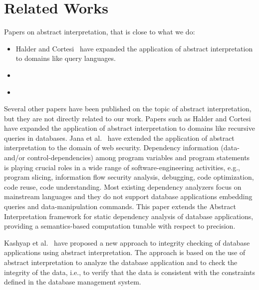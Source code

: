 \section{Related Works}\label{sec:related-works}

Papers on abstract interpretation, that is close to what we do:
\begin{itemize}
    \item Halder and Cortesi~\cite{halder_abstract_2012} have expanded the application of abstract interpretation to domains like query languages.
    \item \cite{jana_extending_2020}
    \item \cite{kashyap_integrity_2022}
\end{itemize}

Several other papers have been published on the topic of abstract interpretation, but they are not directly related to our work.
Papers such as Halder and Cortesi~\cite{halder_abstract_2012} have expanded the application of abstract interpretation to domains like recursive queries in databases.
Jana et al.~\cite{jana_extending_2020} have extended the application of abstract interpretation to the domain of web security.
Dependency information (data- and/or control-dependencies) among program variables and program statements is playing crucial roles in a wide range of software-engineering activities, e.g., program slicing, information flow security analysis, debugging, code optimization, code reuse, code understanding.
Most existing dependency analyzers focus on mainstream languages and they do not support database applications embedding queries and data-manipulation commands.
This paper extends the Abstract Interpretation framework for static dependency analysis of database applications, providing a semantics-based computation tunable with respect to precision.

Kashyap et al.~\cite{kashyap_integrity_2022} have proposed a new approach to integrity checking of database applications using abstract interpretation.
The approach is based on the use of abstract interpretation to analyze the database application and to check the integrity of the data, i.e., to verify that the data is consistent with the constraints defined in the database management system.
